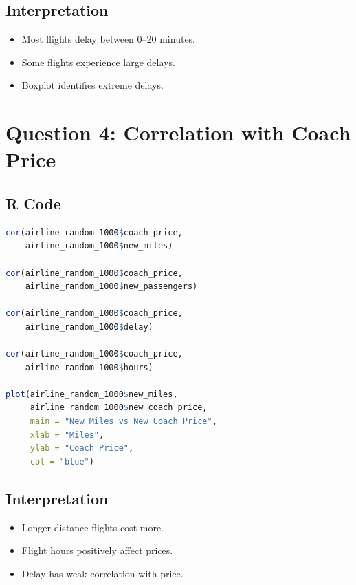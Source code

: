 \documentclass[12pt,a4paper]{article}
\begin{document}
\subsection{Interpretation}

\begin{itemize}
\item Most flights delay between 0--20 minutes.
\item Some flights experience large delays.
\item Boxplot identifies extreme delays.
\end{itemize}


\section{Question 4: Correlation with Coach Price}

\subsection{R Code}

\begin{lstlisting}[language=R]
cor(airline_random_1000$coach_price,
    airline_random_1000$new_miles)

cor(airline_random_1000$coach_price,
    airline_random_1000$new_passengers)

cor(airline_random_1000$coach_price,
    airline_random_1000$delay)

cor(airline_random_1000$coach_price,
    airline_random_1000$hours)

plot(airline_random_1000$new_miles,
     airline_random_1000$new_coach_price,
     main = "New Miles vs New Coach Price",
     xlab = "Miles",
     ylab = "Coach Price",
     col = "blue")
\end{lstlisting}

\subsection{Interpretation}

\begin{itemize}
\item Longer distance flights cost more.
\item Flight hours positively affect prices.
\item Delay has weak correlation with price.
\end{itemize}
\end{document}
